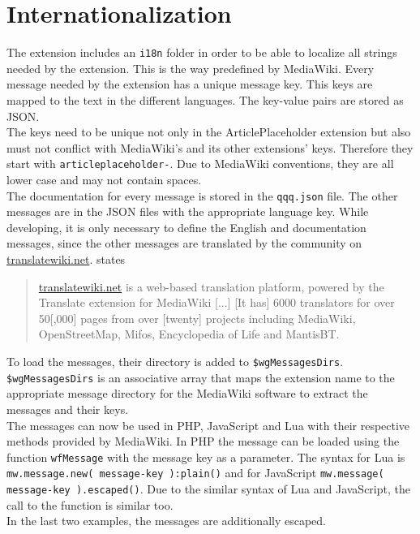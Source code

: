 \section{Internationalization}

The extension includes an \texttt{\justify i18n} folder in order to be able to localize all strings needed by the extension. This is the way predefined by MediaWiki.  Every message needed by the extension has a unique message key. This keys are mapped to the text in the different languages. The key-value pairs are stored as JSON. \citep{wiki:34} \\
The keys need to be unique not only in the ArticlePlaceholder extension but also must not conflict with MediaWiki's and its other extensions' keys. Therefore they start with \texttt{\justify articleplaceholder-}. Due to MediaWiki conventions, they are all lower case and may not contain spaces. \\
The documentation for every message is stored in the \texttt{\justify qqq.json} file. The other messages are in the JSON files with the appropriate language key. While developing, it is only necessary to define the English and documentation messages, since the other messages are translated by the community on \url{translatewiki.net}.  \citet{wiki:26} states
\begin{quote}
 \url{translatewiki.net} is a web-based translation platform, powered by the Translate extension for MediaWiki [...] [It has] 6000 translators for over 50[,000] pages from over [twenty] projects including MediaWiki, OpenStreetMap, Mifos, Encyclopedia of Life and MantisBT.
\end{quote}

To load the messages, their directory is added to \texttt{\justify \$wgMessagesDirs}. \texttt{\justify \$wgMessagesDirs} is an associative array that maps the extension name to the appropriate message directory for the MediaWiki software to extract the messages and their keys. \\
The messages can now be used in PHP, JavaScript and Lua with their respective methods provided by MediaWiki. In PHP the message can be loaded using the function \texttt{\justify wfMessage} with the message key as a parameter. The syntax for Lua is \texttt{\justify mw.message.new( message-key ):plain()} and for JavaScript \texttt{\justify mw.message( message-key ).escaped()}. Due to the similar syntax of Lua and JavaScript, the call to the function is similar too. \\ 
In the last two examples, the messages are additionally escaped.